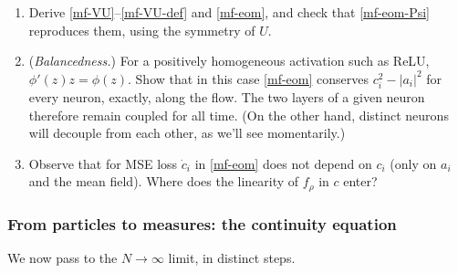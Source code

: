 \documentclass[11pt]{article}
\begin{document}
\begin{exercise}
\label{ex:mf-eom}
\begin{enumerate}
  \item Derive \eqref{mf-VU}--\eqref{mf-VU-def} and \eqref{mf-eom}, and check that \eqref{mf-eom-Psi} reproduces them, using the symmetry of $U$.
  \item\label{ex:mf-eom-balanced} (\emph{Balancedness.}) For a positively homogeneous activation such as ReLU, $\phi'(z)z = \phi(z)$. Show that in this case \eqref{mf-eom} conserves $c_i^2 - |a_i|^2$ for every neuron, exactly, along the flow. The two layers of a given neuron therefore remain coupled for all time. (On the other hand, distinct neurons will decouple from each other, as we'll see momentarily.)
  \item Observe that for MSE loss $\dot c_i$ in \eqref{mf-eom} does not depend on $c_i$ (only on $a_i$ and the mean field). Where does the linearity of $f_\rho$ in $c$ enter?
\end{enumerate}
\end{exercise}

\subsubsection{From particles to measures: the continuity equation}

We now pass to the $N\to\infty$ limit, in distinct steps. 
\end{document}
